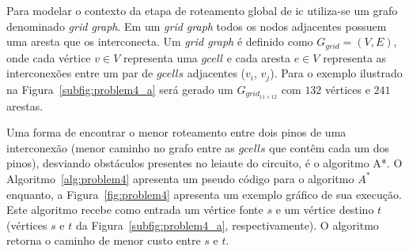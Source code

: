 Para modelar o contexto da etapa de roteamento global de \ac{ic} utiliza-se um grafo denominado \textit{grid graph}.
Em um \textit{grid graph} todos os nodos adjacentes possuem uma aresta que os interconecta.
Um \textit{grid graph} é definido como $G_{grid} = (V,E)$, onde cada vértice $v \in V$ representa uma $gcell$ e cada aresta $e \in V$ representa as interconexões entre um par de $gcells$ adjacentes ($v_i$, $v_j$).
Para o exemplo ilustrado na Figura~\ref{subfig:problem4_a} será gerado um $G_{grid_{11\times12}}$ com $132$ vértices e $241$ arestas.

    



Uma forma de encontrar o menor roteamento entre dois pinos de uma interconexão (menor caminho no grafo entre as $gcells$ que contêm cada um dos pinos), desviando obstáculos presentes no leiaute do circuito, é o algoritmo A*.
O Algoritmo~\ref{alg:problem4} apresenta um pseudo código para o algoritmo $A^*$ enquanto, a Figura~\ref{fig:problem4} apresenta um exemplo gráfico de sua execução.
Este algoritmo recebe como entrada um vértice fonte $s$ e um vértice destino $t$ (vértices $s$ e $t$ da Figura~\ref{subfig:problem4_a}, respectivamente).
O algoritmo retorna o caminho de menor custo entre $s$ e $t$.

